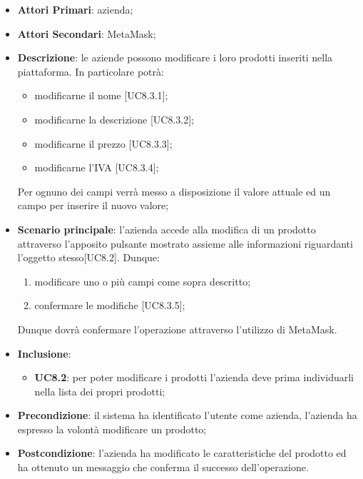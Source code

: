 \begin{itemize}
	\item \textbf{Attori Primari}: azienda;
	\item \textbf{Attori Secondari}: MetaMask\glo;
	\item \textbf{Descrizione}: le aziende possono modificare i loro prodotti inseriti nella piattaforma. In particolare potrà:
	 \begin{itemize}
		\item modificarne il nome [UC8.3.1];
		\item modificarne la descrizione [UC8.3.2];
		\item modificarne il prezzo [UC8.3.3];
		\item modificarne l'IVA [UC8.3.4];
		
	\end{itemize}
	Per ognuno dei campi verrà messo a disposizione il valore attuale ed un campo per inserire il nuovo valore;

	\item \textbf{Scenario principale}: l'azienda accede alla modifica di un prodotto attraverso l'apposito pulsante mostrato assieme alle informazioni riguardanti l'oggetto stesso[UC8.2]. Dunque: 
	\begin{enumerate}[label=\alph*.]
		\item modificare uno o più campi come sopra descritto;
		\item confermare le modifiche [UC8.3.5];
	\end{enumerate}
	Dunque dovrà confermare l'operazione attraverso l'utilizzo di MetaMask\glo.
	\item \textbf{Inclusione}:
	\begin{itemize}
		\item \textbf{UC8.2}: per poter modificare i prodotti l'azienda deve prima individuarli nella lista dei propri prodotti;
	\end{itemize}
	\item \textbf{Precondizione}: il sistema ha identificato l'utente come azienda, l'azienda ha espresso la volontà modificare un prodotto;
	\item \textbf{Postcondizione}: l'azienda ha modificato le caratteristiche del prodotto ed ha ottenuto un messaggio che conferma il successo dell'operazione.	
\end{itemize}

